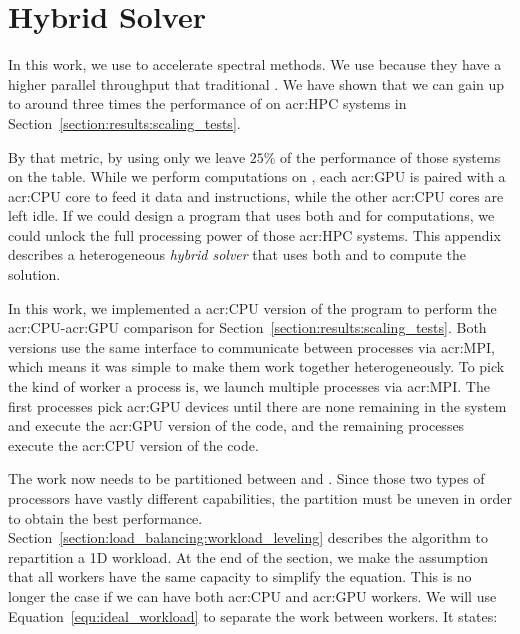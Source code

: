 \chapter{Hybrid Solver}\label{chapter:hybrid_solver}

In this work, we use  to accelerate spectral methods. We use
 because they have a higher parallel throughput that traditional
. We have shown that we can gain up to around three times the performance of
 on \acrshort{acr:HPC} systems in Section~\ref{section:results:scaling_tests}.

By that metric, by using only  we leave \(25 \% \) of the performance of those
systems on the table. While we perform computations on , each \acrshort{acr:GPU}
is paired with a \acrshort{acr:CPU} core to feed it data and instructions, while the other
\acrshort{acr:CPU} cores are left idle. If we could design a program that uses both
 and  for computations, we could unlock the full processing
power of those \acrshort{acr:HPC} systems. This appendix describes a heterogeneous \textit{hybrid
solver} that uses both  and  to compute the solution.

In this work, we implemented a \acrshort{acr:CPU} version of the program to perform the
\acrshort{acr:CPU}-\acrshort{acr:GPU} comparison for Section~\ref{section:results:scaling_tests}.
Both versions use the same interface to communicate between processes via \acrshort{acr:MPI}, which
means it was simple to make them work together heterogeneously. To pick the kind of worker a process
is, we launch multiple processes via \acrshort{acr:MPI}. The first processes pick \acrshort{acr:GPU}
devices until there are none remaining in the system and execute the \acrshort{acr:GPU} version of
the code, and the remaining processes execute the \acrshort{acr:CPU} version of the code.

The work now needs to be partitioned between  and . Since
those two types of processors have vastly different capabilities, the partition must be uneven in
order to obtain the best performance. Section~\ref{section:load_balancing:workload_leveling}
describes the algorithm to repartition a 1D workload. At the end of the section, we make the
assumption that all workers have the same capacity to simplify the equation. This is no longer the
case if we can have both \acrshort{acr:CPU} and \acrshort{acr:GPU} workers. We will use
Equation~\ref{equ:ideal_workload} to separate the work between workers. It states:

